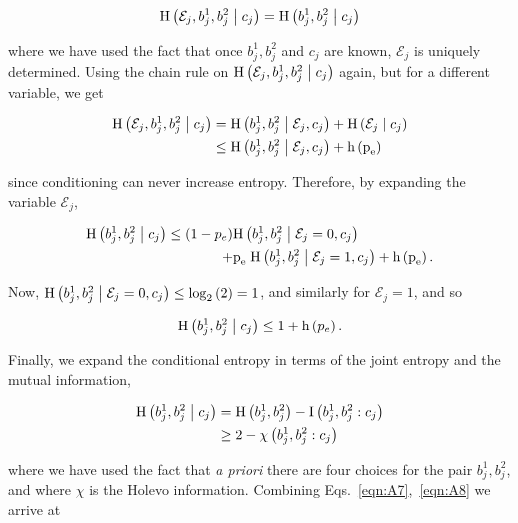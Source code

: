 \begin{equation*}
\text{H}\left(\mathcal{E}_j, b_j^1, b_j^2 \; \middle| \; c_j\right) = \text{H}\left(b_j^1, b_j^2 \; \middle| \; c_j\right)
\end{equation*}

\noindent where we have used the fact that once $b_j^1, b_j^2$ and $c_j$ are known, $\mathcal{E}_j$ is uniquely determined. Using the chain rule on $\text{H}\left(\mathcal{E}_j, b_j^1, b_j^2 \; \middle| \; c_j\right)$ again, but for a different variable, we get

\begin{align*}
\text{H}\left(\mathcal{E}_j, b_j^1, b_j^2 \; \middle| \; c_j\right) &= \text{H}\left(b_j^1, b_j^2 \; \middle| \; \mathcal{E}_j, c_j\right) + \text{H}\left(\mathcal{E}_j \; \middle| \; c_j\right) \notag \\
&\le \text{H}\left(b_j^1, b_j^2 \; \middle| \; \mathcal{E}_j, c_j\right) + \text{h}\left(\text{p}_{\text{e}}\right)
\end{align*}

\noindent since conditioning can never increase entropy. Therefore, by expanding the variable $\mathcal{E}_j$,

\begin{align*}
\text{H}\left(b_j^1, b_j^2 \; \middle| \; c_j\right) \le \left(1 - p_e\right) &\text{H}\left(b_j^1, b_j^2 \; \middle| \; \mathcal{E}_j = 0, c_j\right) \\ + &\text{p}_{\text{e}} \; \text{H}\left(b_j^1, b_j^2 \; \middle| \; \mathcal{E}_j=1, c_j\right) + \text{h}\left(\text{p}_{\text{e}}\right).
\end{align*}

\noindent Now, $\text{H}\left(b_j^1, b_j^2 \; \middle| \; \mathcal{E}_j=0, c_j\right) \le \log_2\left(2\right) = 1$, and similarly for $\mathcal{E}_j=1$, and so

\begin{equation}\label{eqn:A7}
\text{H}\left(b_j^1, b_j^2 \; \middle| \; c_j\right) \le 1 + \text{h}\left(p_e\right).
\end{equation}

\noindent Finally, we expand the conditional entropy in terms of the joint entropy and the mutual information,

\begin{align}\label{eqn:A8}
\text{H}\left(b_j^1, b_j^2 \; \middle| \; c_j\right) &= \text{H}\left(b_j^1, b_j^2\right) - \text{I}\left(b_j^1, b_j^2 : c_j\right) \notag \\
&\ge 2 - \chi\left(b_j^1, b_j^2 : c_j\right)
\end{align}

\noindent where we have used the fact that \emph{a priori} there are four choices for the pair $b_j^1, b_j^2$, and where $\chi$ is the Holevo information. Combining Eqs.~\ref{eqn:A7},~\ref{eqn:A8} we arrive at

